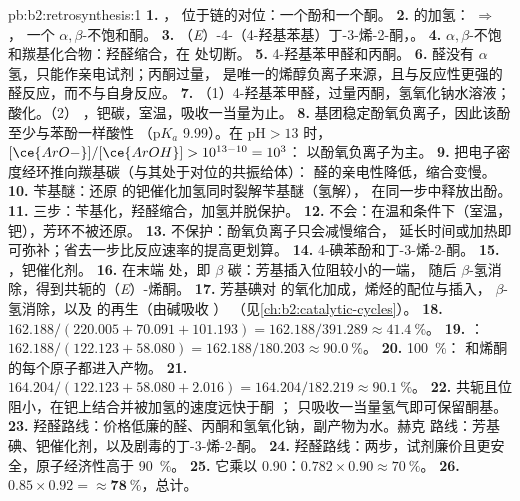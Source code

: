 \begin{solution}{pb:b2:retrosynthesis:1}
\textbf{1.} ， 位于链的对位：一个酚和一个酮。
\textbf{2.}  的加氢： $\Rightarrow$ ，
一个 $\alpha,\beta$-不饱和酮。
\textbf{3.} （\textit{E}）-4-（4-羟基苯基）丁-3-烯-2-酮，。
\textbf{4.} $\alpha,\beta$-不饱和羰基化合物：羟醛缩合，在  处切断。
\textbf{5.} 4-羟基苯甲醛和丙酮。
\textbf{6.} 醛没有 $\alpha$ 氢，只能作亲电试剂；丙酮过量，
是唯一的烯醇负离子来源，且与反应性更强的醛反应，而不与自身反应。
\textbf{7.} （1）4-羟基苯甲醛，过量丙酮，氢氧化钠水溶液；酸化。（2）
，钯碳，室温，吸收一当量为止。
\textbf{8.}  基团稳定酚氧负离子，因此该酚至少与苯酚一样酸性
（$\mathrm pK_a$ 9.99）。在 $\mathrm{pH} > 13$ 时，$[\ce{ArO-}]/[\ce{ArOH}] > 10^{13-10} = 10^3$：
以酚氧负离子为主。
\textbf{9.}  把电子密度经环推向羰基碳（与其处于对位的共振给体）：
醛的亲电性降低，缩合变慢。
\textbf{10.} 苄基醚：还原  的钯催化加氢同时裂解苄基醚（氢解），
在同一步中释放出酚。
\textbf{11.} 三步：苄基化，羟醛缩合，加氢并脱保护。
\textbf{12.} 不会：在温和条件下（室温，钯），芳环不被还原。
\textbf{13.} 不保护：酚氧负离子只会减慢缩合，
延长时间或加热即可弥补；省去一步比反应速率的提高更划算。
\textbf{14.} 4-碘苯酚和丁-3-烯-2-酮。
\textbf{15.} ，钯催化剂。
\textbf{16.} 在末端  处，即 $\beta$ 碳：芳基插入位阻较小的一端，
随后 $\beta$-氢消除，得到共轭的（\textit{E}）-烯酮。
\textbf{17.} 芳基碘对  的氧化加成，烯烃的配位与插入，
$\beta$-氢消除，以及  的再生（由碱吸收 ）
（见\cref{ch:b2:catalytic-cycles}）。
\textbf{18.} $162.188/(220.005 + 70.091 + 101.193) = 162.188/391.289 \approx 41.4~\%$。
\textbf{19.} ：$162.188/(122.123 + 58.080) = 162.188/180.203
\approx 90.0~\%$。
\textbf{20.} 100~\%： 和烯酮的每个原子都进入产物。
\textbf{21.} $164.204/(122.123 + 58.080 + 2.016) = 164.204/182.219 \approx 90.1~\%$。
\textbf{22.}  共轭且位阻小，在钯上结合并被加氢的速度远快于酮 ；
只吸收一当量氢气即可保留酮基。
\textbf{23.} 羟醛路线：价格低廉的醛、丙酮和氢氧化钠，副产物为水。赫克
路线：芳基碘、钯催化剂，以及剧毒的丁-3-烯-2-酮。
\textbf{24.} 羟醛路线：两步，试剂廉价且更安全，原子经济性高于 90~\%。
\textbf{25.} 它乘以 0.90：$0.782 \times 0.90 \approx 70~\%$。
\textbf{26.} $0.85 \times 0.92 = \boldsymbol{\approx 78~\%}$，总计。
\end{solution}
